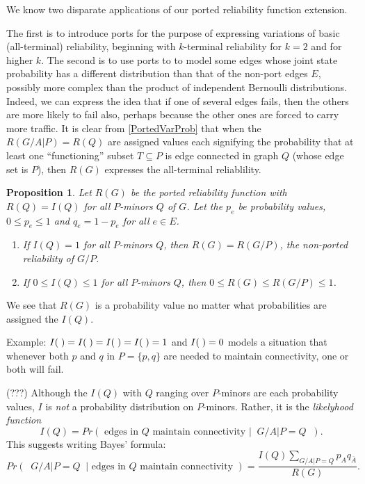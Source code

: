 \documentclass[12pt,leqno]{amsart}
\newtheorem{prop}[lem]{Proposition}
\theoremstyle{remark}
\newcommand{\scomp}[1]{\ensuremath{\overline{#1}}}
\newcommand{\pzqz}{\;\raisebox{-0.2\height}{}}
\newcommand{\pzqn}{\;\raisebox{-0.2\height}{}}
\newcommand{\pnqz}{\;\raisebox{-0.2\height}{}}
\newcommand{\pnqn}{\;\raisebox{-0.2\height}{}}
\newcommand{\pqegg}{\;\raisebox{-0.2\height}{}}
\begin{document}
We know two disparate applications of our ported reliability 
function extension.

The first is to introduce ports for the purpose of expressing
variations of basic (all-terminal) reliability, beginning
with $k$-terminal reliability for $k=2$ and for higher $k$.
The second is to use ports to to model some edges whose joint
state probability has a different distribution than that
of the non-port edges $E$, possibly more complex than
the product of independent Bernoulli distributions.  Indeed, we
can express the idea that if one of several edges fails, then
the others are more likely to fail also, perhaps because the
other ones are forced to carry more traffic.  It is clear from
\eqref{PortedVarProb} that when the $R(G/A|P)=R(Q)$ are assigned
values each signifying the probability that at least one 
``functioning'' 
subset $T\subseteq P$ is edge connected in graph $Q$ (whose edge set is $P$),
then $R(G)$ expresses the all-terminal reliablility.

\begin{prop}
Let $R(G)$ be the ported reliability function with 
$R(Q)=I(Q)$ for all $P$-minors $Q$ of $G$.  Let
the $p_e$ be probability values, $0\le p_e \le 1$
and $q_e = 1-p_e$ for all $e\in E$.
\begin{enumerate}
\item If $I(Q)=1$ for all $P$-minors $Q$, then
$R(G)=R(G/P)$, the non-ported reliability of $G/P$.
\item If $0\le I(Q)\le 1$ for all $P$-minors $Q$, then
$0\le R(G) \le R(G/P) \le 1$.
\end{enumerate}
\end{prop}

We see that $R(G)$ is a probability value no matter what
probabilities are assigned the $I(Q)$.

Example: $I(\pzqz) = I(\pzqn) = I(\pnqz) = I(\pqegg) = 1$ and  
$I(\pnqn) = 0$ models a situation that whenever both $p$ and $q$
in $P=\{p,q\}$ are needed to maintain connectivity, one
or both will fail.

(???) Although the $I(Q)$ with $Q$ ranging over $P$-minors are each 
probability values, $I$ is \emph{not} a probability distribution
on $P$-minors.  Rather, it is the \emph{likelyhood function}
\[
I(Q) = Pr(\text{ edges in }Q\text{ maintain connectivity }|\;\; G/A|P = Q\;\;).
\]
This suggests writing Bayes' formula:
\[
Pr(\;\; G/A|P = Q\;\;| \text{ edges in }Q\text{ maintain connectivity })=
\frac{I(Q)\sum_{G/A|P=Q}p_Aq_{\scomp{A}}}{R(G)}.
\]
\end{document}
